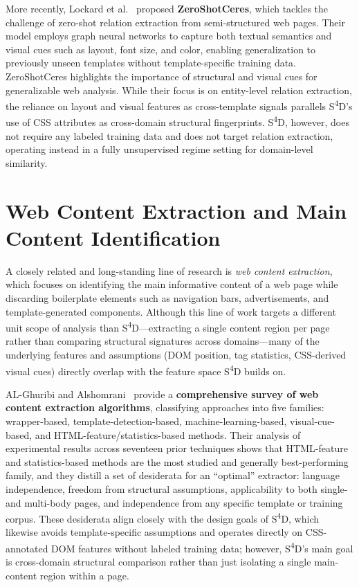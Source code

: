 More recently, Lockard et al.~\cite{lockard2020zeroshotceres} proposed \textbf{ZeroShotCeres}, which tackles the challenge of zero-shot relation extraction from semi-structured web pages. Their model employs graph neural networks to capture both textual semantics and visual cues such as layout, font size, and color, enabling generalization to previously unseen templates without template-specific training data. ZeroShotCeres highlights the importance of structural and visual cues for generalizable web analysis. While their focus is on entity-level relation extraction, the reliance on layout and visual features as cross-template signals parallels S\textsuperscript{4}D's use of CSS attributes as cross-domain structural fingerprints. S\textsuperscript{4}D, however, does not require any labeled training data and does not target relation extraction, operating instead in a fully unsupervised regime setting for domain-level similarity.

\section{Web Content Extraction and Main Content Identification}
\label{sec:content-extraction}

A closely related and long-standing line of research is \emph{web content extraction}, which focuses on identifying the main informative content of a web page while discarding boilerplate elements such as navigation bars, advertisements, and template-generated components. Although this line of work targets a different unit scope of analysis than S\textsuperscript{4}D---extracting a single content region per page rather than comparing structural signatures across domains---many of the underlying features and assumptions (DOM position, tag statistics, CSS-derived visual cues) directly overlap with the feature space S\textsuperscript{4}D builds on.

AL-Ghuribi and Alshomrani~\cite{alghuribi2013survey} provide a \textbf{comprehensive survey of web content extraction algorithms}, classifying approaches into five families: wrapper-based, template-detection-based, machine-learning-based, visual-cue-based, and HTML-feature/statistics-based methods. Their analysis of experimental results across seventeen prior techniques shows that HTML-feature and statistics-based methods are the most studied and generally best-performing family, and they distill a set of desiderata for an ``optimal'' extractor: language independence, freedom from structural assumptions, applicability to both single- and multi-body pages, and independence from any specific template or training corpus. These desiderata align closely with the design goals of S\textsuperscript{4}D, which likewise avoids template-specific assumptions and operates directly on CSS-annotated DOM features without labeled training data; however, S\textsuperscript{4}D's main goal is cross-domain structural comparison rather than just isolating a single main-content region within a page.


